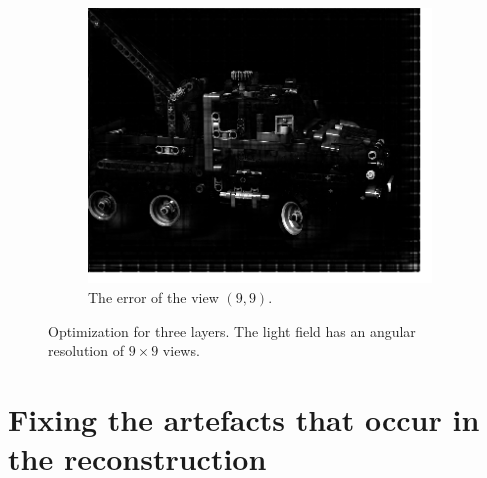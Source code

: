 \documentclass[11pt,a4paper,titlepage]{article}
\begin{document}
\begin{figure}[h]
\begin{subfigure}[t]{0.4\textwidth}
		\includegraphics[width=\textwidth]{results/legotruck_perspective_rec_3Layers_r=1/custom_view_error.png}
		\caption{The error of the view $\left( 9, 9 \right)$.}
	\end{subfigure}

	\caption{Optimization for three layers. The light field has an angular resolution of $9\times 9$ views.}
\end{figure}

\clearpage
\section{Fixing the artefacts that occur in the reconstruction}
\end{document}

